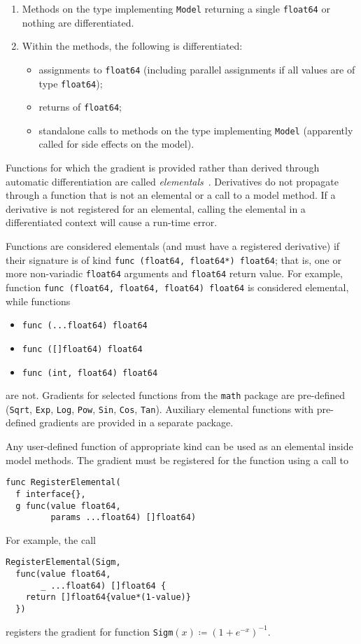 \documentclass[sigplan,review,10pt,anonymous]{acmart}
\begin{document}
\begin{sloppypar}
\begin{enumerate}
  \item Methods on the type implementing \lstinline{Model} returning a
    single \lstinline{float64} or nothing are differentiated.
  \item Within the methods, the following is differentiated:
    \begin{itemize}
      \item assignments to \lstinline{float64} (including parallel
        assignments if all values are of type
        \lstinline{float64});
      \item returns of \lstinline{float64};
      \item standalone calls to methods on the type implementing
        \lstinline{Model} (apparently called for side  effects on
        the model).
    \end{itemize}
\end{enumerate}

Functions for which the gradient is provided rather than derived
through automatic differentiation are called
\textit{elementals}~\cite{GW08}.  Derivatives do not propagate
through a function that is not an elemental or a call to a model
method. If a derivative is not registered for an elemental,
calling the elemental in a differentiated context will cause a
run-time error.

Functions are considered elementals (and must have a
registered derivative) if their signature is of kind
\lstinline{func (float64, float64*) float64}; that is, 
one or more non-variadic \lstinline{float64} arguments and
\lstinline{float64} return value. For example, function
\lstinline{func (float64, float64, float64) float64}
is considered elemental, while functions
\begin{itemize}
  \item \lstinline{func (...float64) float64}
  \item \lstinline{func ([]float64) float64}
  \item \lstinline{func (int, float64) float64}
\end{itemize}
are not. Gradients for selected functions from the
\lstinline{math} package are pre-defined (\lstinline{Sqrt},
\lstinline{Exp}, \lstinline{Log}, \lstinline{Pow},
\lstinline{Sin}, \lstinline{Cos}, \lstinline{Tan}). Auxiliary
elemental functions with pre-defined gradients are provided in a
separate package.

Any user-defined function of appropriate kind can be used as an
elemental inside model methods. The gradient must be registered
for the function using a call to
\begin{lstlisting}
func RegisterElemental(
  f interface{}, 
  g func(value float64,
         params ...float64) []float64)
\end{lstlisting} For
example, the call
\begin{lstlisting}
RegisterElemental(Sigm,
  func(value float64,
       _ ...float64) []float64 {
    return []float64{value*(1-value)}
  })
\end{lstlisting}
registers the gradient for function
\lstinline{Sigm}$(x)\coloneq\left(1+e^{-x}\right)^{-1}$.


\end{sloppypar}
\end{document}
